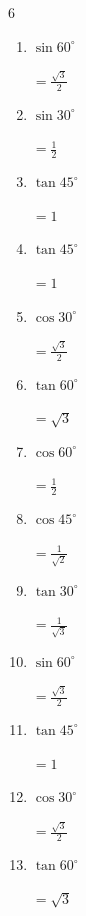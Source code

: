 \begin{multicols}{6}
\begin{enumerate}
  \item $\displaystyle \sin{60^\circ}$

        $\displaystyle =\frac{\sqrt{3}}{2}$

  \item $\displaystyle \sin{30^\circ}$

        $\displaystyle =\frac{1}{2}$

  \item $\displaystyle \tan{45^\circ}$

        $\displaystyle =1$

  \item $\displaystyle \tan{45^\circ}$

        $\displaystyle =1$

  \item $\displaystyle \cos{30^\circ}$

        $\displaystyle =\frac{\sqrt{3}}{2}$

  \item $\displaystyle \tan{60^\circ}$

        $\displaystyle =\sqrt{3}$

  \item $\displaystyle \cos{60^\circ}$

        $\displaystyle =\frac{1}{2}$

  \item $\displaystyle \cos{45^\circ}$

        $\displaystyle =\frac{1}{\sqrt{2}}$

  \item $\displaystyle \tan{30^\circ}$

        $\displaystyle =\frac{1}{\sqrt{3}}$

  \item $\displaystyle \sin{60^\circ}$

        $\displaystyle =\frac{\sqrt{3}}{2}$

  \item $\displaystyle \tan{45^\circ}$

        $\displaystyle =1$

\columnbreak %

  \item $\displaystyle \cos{30^\circ}$

        $\displaystyle =\frac{\sqrt{3}}{2}$

  \item $\displaystyle \tan{60^\circ}$

        $\displaystyle =\sqrt{3}$


\end{enumerate}
\end{multicols}
